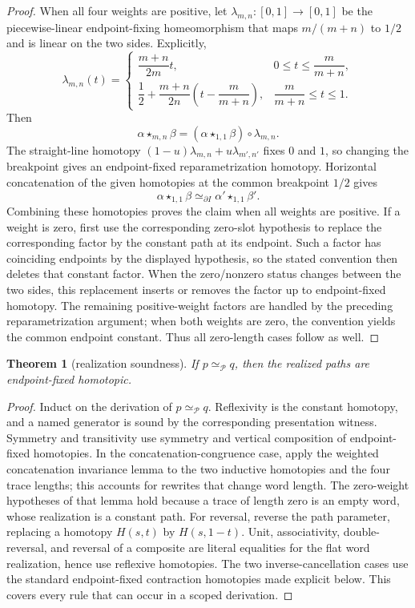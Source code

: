 \documentclass[10pt,reqno]{amsart}
\theoremstyle{definition}
\theoremstyle{plain}
\newtheorem{theorem}[definition]{Theorem}
\theoremstyle{remark}
\newcommand{\RwEq}{\mathrel{\simeq_{\!\mathcal P}}}
\begin{document}
\begin{proof}
When all four weights are positive, let $\lambda_{m,n}:[0,1]\to[0,1]$ be
the piecewise-linear endpoint-fixing homeomorphism that maps
$m/(m+n)$ to $1/2$ and is linear on the two sides.  Explicitly,
\[
 \lambda_{m,n}(t)=
 \begin{cases}
   \dfrac{m+n}{2m}t,
     &0\leq t\leq\dfrac{m}{m+n},\\[6pt]
   \dfrac12+\dfrac{m+n}{2n}\left(t-\dfrac{m}{m+n}\right),
     &\dfrac{m}{m+n}\leq t\leq1.
 \end{cases}
\]
Then
\[
  \alpha\star_{m,n}\beta
  =(\alpha\star_{1,1}\beta)\circ\lambda_{m,n}.
\]
The straight-line homotopy $(1-u)\lambda_{m,n}+u\lambda_{m',n'}$ fixes $0$ and
$1$, so changing the breakpoint gives an endpoint-fixed reparametrization
homotopy.  Horizontal concatenation of the
given homotopies at the common breakpoint $1/2$ gives
\[
  \alpha\star_{1,1}\beta
  \simeq_{\partial I}
  \alpha'\star_{1,1}\beta'.
\]
Combining these homotopies proves the claim when all weights are positive.
If a weight is zero, first use the corresponding zero-slot hypothesis to replace
the corresponding factor by the constant path at its endpoint.  Such a factor
has coinciding endpoints by the displayed hypothesis, so the stated
convention then deletes that constant factor.  When the zero/nonzero status
changes between the two sides, this replacement inserts or removes the factor
up to endpoint-fixed homotopy.  The remaining positive-weight factors are
handled by the preceding reparametrization argument; when both weights are
zero, the convention yields the common endpoint constant.  Thus all
zero-length cases follow as well.
\end{proof}

\begin{theorem}[realization soundness]
\label{thm:realization-soundness}
If $p\RwEq q$, then the realized paths are endpoint-fixed homotopic.
\end{theorem}

\begin{proof}
Induct on the derivation of $p\RwEq q$.  Reflexivity is the constant
homotopy, and a named generator is sound by the corresponding presentation
witness.  Symmetry and transitivity use symmetry and vertical composition of
endpoint-fixed homotopies.  In the concatenation-congruence case, apply the
weighted concatenation invariance lemma to the two inductive homotopies and
the four trace lengths; this accounts for rewrites that change word length.
The zero-weight hypotheses of that lemma hold because a trace of length zero
is an empty word, whose realization is a constant path.
For reversal, reverse the path parameter, replacing a homotopy $H(s,t)$ by
$H(s,1-t)$.  Unit, associativity,
double-reversal, and reversal of a composite are literal equalities for the
flat word realization, hence use reflexive homotopies.  The two
inverse-cancellation cases use the standard
endpoint-fixed contraction homotopies made explicit below.  This covers every rule that can occur in a scoped derivation.
\end{proof}
\end{document}
